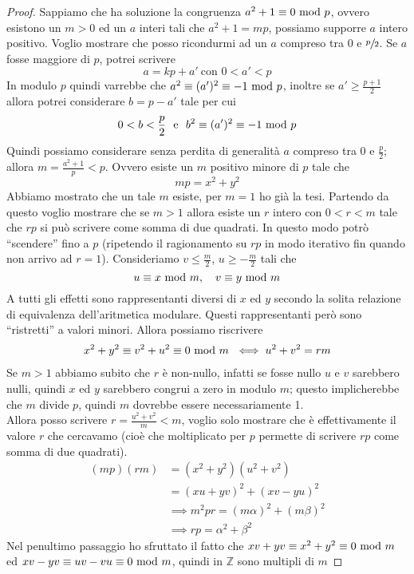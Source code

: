 \begin{proof}
	Sappiamo che ha soluzione la congruenza $a^2+1\equiv0\ \mathrm{mod}\ p$, ovvero esistono un $m>0$ ed un $a$ interi tali che $a^2+1=mp$, possiamo supporre $a$ intero positivo. Voglio mostrare che posso ricondurmi ad un $a$ compreso tra $0$ e $\sfrac{p}{2}$. Se $a$ fosse maggiore di $p$, potrei scrivere 
	\begin{equation*}
	a=kp+a' \ \text{con $0<a'<p$}
	\end{equation*}
	In modulo $p$ quindi varrebbe che $a^2\equiv(a')^2\equiv-1\ \mathrm{mod}\ p$, inoltre se $a'\geq\frac{p+1}{2}$ allora potrei considerare $b=p-a'$ tale per cui
	\begin{equation*}
	0<b<\frac{p}{2} \ \ \text{e} \ \ b^2\equiv(a')^2\equiv-1\Mod p
	\end{equation*}
	Quindi possiamo considerare senza perdita di generalità $a$ compreso tra 0 e $\frac{p}{2}$; allora $m=\frac{a^2+1}{p}<p$. Ovvero esiste un $m$ positivo minore di $p$ tale che 
	\begin{equation*}
	mp=x^2+y^2
	\end{equation*}
	Abbiamo mostrato che un tale $m$ esiste, per $m=1$ ho già la tesi. Partendo da questo voglio mostrare che se $m>1$ allora esiste un $r$ intero con $0<r<m$ tale che $rp$ si può scrivere come somma di due quadrati. In questo modo potrò \enquote{scendere} fino a $p$ (ripetendo il ragionamento su $rp$ in modo iterativo fin quando non arrivo ad $r=1$). Consideriamo $v\leq\frac{m}{2}$, $u\geq-\frac{m}{2}$ tali che 
	\begin{equation*}
	u\equiv x\ \mathrm{mod}\ m, \ \ \ v\equiv y\ \mathrm{mod}\ m
	\end{equation*}
	A tutti gli effetti sono rappresentanti diversi di $x$ ed $y$ secondo la solita relazione di equivalenza dell'aritmetica modulare. Questi rappresentanti però sono \enquote{ristretti} a valori minori.
	Allora possiamo riscrivere
	\begin{align*}
	x^2+y^2\equiv v^2+u^2 \equiv 0\ \mathrm{mod}\ m \ \iff u^2+v^2=rm
	\end{align*}
	Se $m>1$ abbiamo subito che $r$ è non-nullo, infatti se fosse nullo $u$ e $v$ sarebbero nulli, quindi $x$ ed $y$ sarebbero congrui a zero in modulo $m$; questo implicherebbe che $m$ divide $p$, quindi $m$ dovrebbe essere necessariamente 1. \\ 
	Allora posso scrivere $r=\frac{u^2+v^2}{m}<m$, voglio solo mostrare che è effettivamente il valore $r$ che cercavamo (cioè che moltiplicato per $p$ permette di scrivere $rp$ come somma di due quadrati).
	\begin{align*}
	(mp)(rm)&=(x^2+y^2)(u^2+v^2)\\
	&=(xu+yv)^2+(xv-yu)^2\\
	&\implies m^2pr=(m\alpha)^2+(m\beta)^2\\
	&\implies rp=\alpha^2+\beta^2
	\end{align*}
	Nel penultimo passaggio ho sfruttato il fatto che $xv+yv\equiv x^2+y^2\equiv0\ \mathrm{mod}\ m$ ed $xv-yv\equiv uv-vu\equiv0\ \mathrm{mod}\ m$, quindi in $\mathbb{Z}$ sono multipli di $m$
\end{proof}
